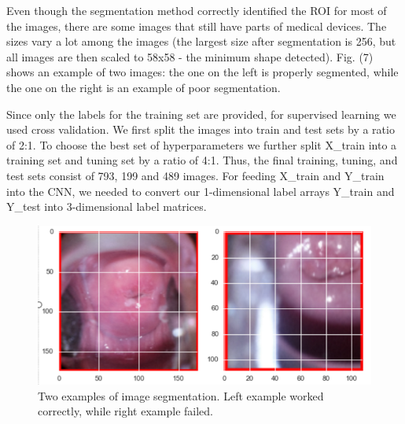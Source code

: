 \documentclass{article}
\begin{document}
Even though the segmentation method correctly identified the ROI for most of the images, there are some images that still have parts of medical devices. The sizes vary a lot among the images (the largest size after segmentation is 256, but all images are then scaled to 58x58 - the minimum shape detected).  Fig. (7) shows an example of two images: the one on the left is properly segmented, while the one on the right is an example of poor segmentation.

Since only the labels for the training set are provided, for
supervised learning we used cross validation. We first split the
images into train and test sets by a ratio of 2:1. To choose the best
set of hyperparameters we further split X\_train into a training set
and tuning set by a ratio of 4:1. Thus, the final training, tuning,
and test sets consist of 793, 199 and 489 images. For feeding X\_train and Y\_train into the CNN, we needed to convert
our 1-dimensional label arrays Y\_train and Y\_test into 3-dimensional
label matrices. 

\begin{figure}[ht]
  \vskip 0.2in
  \begin{center}
  \centerline{\includegraphics[width=\columnwidth]{cervix}}
  \caption {Two examples of image segmentation. Left example worked correctly, while right example failed.}
  \label{badimages}
  \end{center}
  \vskip -0.2in
\end{figure}
\end{document}
